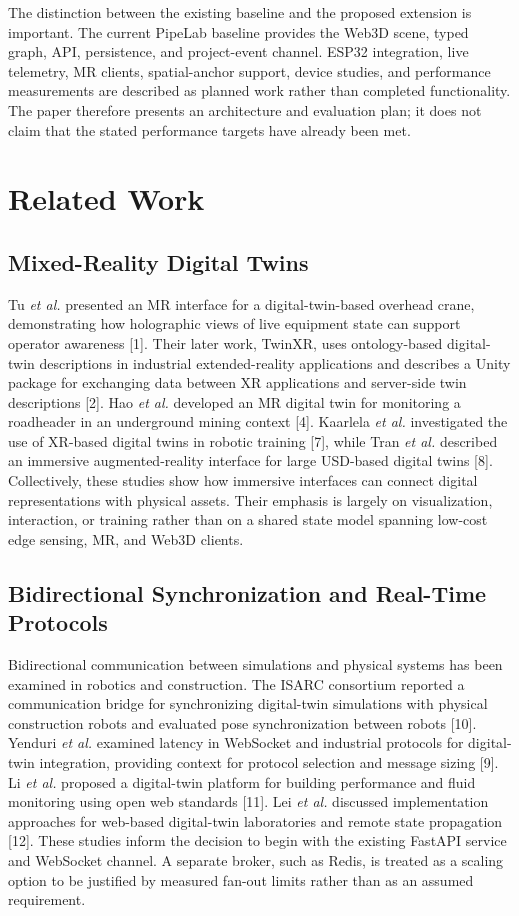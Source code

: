 \documentclass[conference]{IEEEtran}
\begin{document}
The distinction between the existing baseline and the proposed extension is important. The current PipeLab baseline provides the Web3D scene, typed graph, API, persistence, and project-event channel. ESP32 integration, live telemetry, MR clients, spatial-anchor support, device studies, and performance measurements are described as planned work rather than completed functionality. The paper therefore presents an architecture and evaluation plan; it does not claim that the stated performance targets have already been met.

\section{Related Work}
\subsection{Mixed-Reality Digital Twins}
Tu \emph{et al.} presented an MR interface for a digital-twin-based overhead crane, demonstrating how holographic views of live equipment state can support operator awareness [1]. Their later work, TwinXR, uses ontology-based digital-twin descriptions in industrial extended-reality applications and describes a Unity package for exchanging data between XR applications and server-side twin descriptions [2]. Hao \emph{et al.} developed an MR digital twin for monitoring a roadheader in an underground mining context [4]. Kaarlela \emph{et al.} investigated the use of XR-based digital twins in robotic training [7], while Tran \emph{et al.} described an immersive augmented-reality interface for large USD-based digital twins [8]. Collectively, these studies show how immersive interfaces can connect digital representations with physical assets. Their emphasis is largely on visualization, interaction, or training rather than on a shared state model spanning low-cost edge sensing, MR, and Web3D clients.

\subsection{Bidirectional Synchronization and Real-Time Protocols}
Bidirectional communication between simulations and physical systems has been examined in robotics and construction. The ISARC consortium reported a communication bridge for synchronizing digital-twin simulations with physical construction robots and evaluated pose synchronization between robots [10]. Yenduri \emph{et al.} examined latency in WebSocket and industrial protocols for digital-twin integration, providing context for protocol selection and message sizing [9]. Li \emph{et al.} proposed a digital-twin platform for building performance and fluid monitoring using open web standards [11]. Lei \emph{et al.} discussed implementation approaches for web-based digital-twin laboratories and remote state propagation [12]. These studies inform the decision to begin with the existing FastAPI service and WebSocket channel. A separate broker, such as Redis, is treated as a scaling option to be justified by measured fan-out limits rather than as an assumed requirement.
\end{document}
